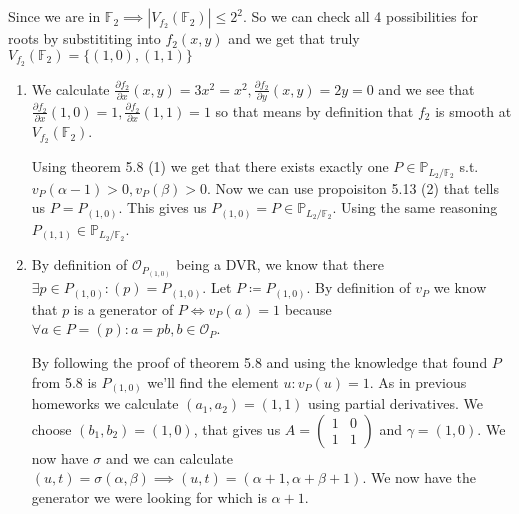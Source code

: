 \documentclass[12pt, a4paper]{article}
\begin{document}
\section{}
Since we are in $\mathbb{F}_2 \implies |V_{f_2}(\mathbb{F}_2)| \leq 2^2$. So we can check all 4 possibilities for roots by substititing into $f_2(x,y)$ and we get that truly $ V_{f_2}(\mathbb{F}_2) = \{(1,0),(1,1)\}$
\begin{enumerate}[label=(\alph*)]
\item We calculate $\frac{\partial f_2}{\partial x} (x,y) = 3x^2=x^2, \frac{\partial f_2}{\partial y} (x,y) = 2y=0$ and we see that $\frac{\partial f_2}{\partial x} (1,0)=1, \frac{\partial f_2}{\partial x} (1,1) = 1$ so that means by definition that $f_2$ is smooth at $ V_{f_2}(\mathbb{F}_2)$.

Using theorem 5.8 (1) we get that there exists exactly one $P \in \mathbb{P}_{L_2/\mathbb{F}_2}$ s.t. $v_P(\alpha-1)>0,v_P(\beta)>0$. Now we can use propoisiton 5.13 (2) that tells us $P=P_{(1,0)}$. This gives us $P_{(1,0)}=P \in \mathbb{P}_{L_2/\mathbb{F}_2}$. Using the same reasoning $P_{(1,1)} \in \mathbb{P}_{L_2/\mathbb{F}_2}$.

\item By definition of $\mathcal{O}_{P_{(1,0)}}$ being a DVR, we know that there $\exists p \in P_{(1,0)}: (p)=P_{(1,0)}$. Let $P \coloneqq P_{(1,0)}$. By definition of $v_P$ we know that $p$ is a generator of $P \iff v_P(a) = 1$ because $\forall a \in P = (p): a = pb, b \in \mathcal{O}_{P}$.

By following the proof of theorem 5.8 and using the knowledge that found $P$ from 5.8 is $P_{(1,0)}$ we'll find the element $u: v_P(u)=1$. As in previous homeworks we calculate $(a_1,a_2)=(1,1)$ using partial derivatives. We choose $(b_1,b_2)=(1,0)$, that gives us $A = \begin{pmatrix}
1 & 0\\
1 & 1
\end{pmatrix}$ and $\gamma = (1,0)$. We now have $\sigma$ and we can calculate $(u,t)=\sigma(\alpha, \beta) \implies (u,t)=(\alpha+1, \alpha+\beta+1)$. We now have the generator we were looking for which is $\alpha+1$.
\end{enumerate}
\end{document}
